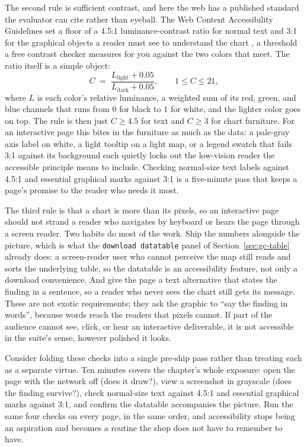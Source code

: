 \documentclass[
    a4paper,
    fontsize=10pt,
    twoside=true,
    numbers=noenddot,
]{kaobook}
\begin{document}
The second rule is sufficient contrast, and here the web has a published standard the evaluator can cite rather than eyeball. The Web Content Accessibility Guidelines set a floor of a 4.5:1 luminance-contrast ratio for normal text and 3:1 for the graphical objects a reader must see to understand the chart \parencite{w3c2018wcag}, a threshold a free contrast checker measures for you against the two colors that meet. The ratio itself is a simple object:
\[
  C \;=\; \frac{L_{\text{light}} + 0.05}{L_{\text{dark}} + 0.05},
  \qquad 1 \le C \le 21,
\]
where $L$ is each color's relative luminance, a weighted sum of its red, green, and blue channels that runs from $0$ for black to $1$ for white, and the lighter color goes on top. The rule is then just $C \ge 4.5$ for text and $C \ge 3$ for chart furniture. For an interactive page this bites in the furniture as much as the data: a pale-gray axis label on white, a light tooltip on a light map, or a legend swatch that fails 3:1 against its background each quietly locks out the low-vision reader the accessible principle means to include. Checking normal-size text labels against 4.5:1 and essential graphical marks against 3:1 is a five-minute pass that keeps a page's promise to the reader who needs it most.

The third rule is that a chart is more than its pixels, so an interactive page should not strand a reader who navigates by keyboard or hears the page through a screen reader. Two habits do most of the work. Ship the numbers alongside the picture, which is what the \texttt{download datatable} panel of Section~\ref{sec:gc-table} already does: a screen-reader user who cannot perceive the map still reads and sorts the underlying table, so the datatable is an accessibility feature, not only a download convenience. And give the page a text alternative that states the finding in a sentence, so a reader who never sees the chart still gets its message. These are not exotic requirements; they ask the graphic to \enquote{say the finding in words}, because words reach the readers that pixels cannot. If part of the audience cannot see, click, or hear an interactive deliverable, it is not accessible in the suite's sense, however polished it looks.

Consider folding these checks into a single pre-ship pass rather than treating each as a separate virtue. Ten minutes covers the chapter's whole exposure: open the page with the network off (does it draw?), view a screenshot in grayscale (does the finding survive?), check normal-size text against 4.5:1 and essential graphical marks against 3:1, and confirm the datatable accompanies the picture. Run the same four checks on every page, in the same order, and accessibility stops being an aspiration and becomes a routine the shop does not have to remember to have.
\end{document}
